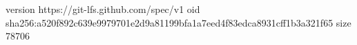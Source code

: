 version https://git-lfs.github.com/spec/v1
oid sha256:a520f892c639e9979701e2d9a81199bfa1a7eed4f83edca8931cff1b3a321f65
size 78706
